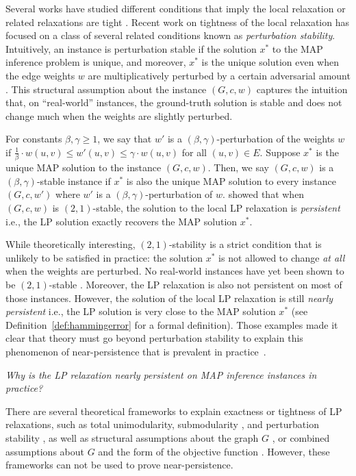 Several works have studied different conditions that imply the local relaxation or related relaxations are tight \citep[e.g.,][]{kolmogorov2005optimality, wainwright2008graphical, thapper2012power, weller2016tightness,rowland2017conditions}.
Recent work on tightness of the local relaxation has focused on a class of several related conditions known as \emph{perturbation stability}.
Intuitively, an instance is perturbation stable if the solution $x^*$ to the MAP inference problem is unique, and moreover, $x^*$ is the unique solution even when the edge weights $w$ are multiplicatively perturbed by a certain adversarial amount \cite{BLstable}.
This structural assumption about the instance $(G,c,w)$ captures the intuition that, on ``real-world'' instances, the ground-truth solution is stable and does not change much when the weights are slightly perturbed.

For constants $\beta, \gamma \geq 1$, we say that $w'$ is a $(\beta,\gamma)$-perturbation of the weights $w$ if $\frac{1}{\beta}\cdot w(u,v) \le w'(u,v) \le \gamma \cdot w(u,v)$ for all $(u,v)\in E$. 
Suppose $x^*$ is the unique MAP solution to the instance $(G,c,w)$. Then, we say $(G,c,w)$ is a $(\beta,\gamma)$-stable instance if $x^*$ is also the unique MAP solution to every instance $(G,c,w')$ where $w'$ is a $(\beta,\gamma)$-perturbation of $w$.
 \citet{LanSonVij18} showed that when $(G,c,w)$ is $(2,1)$-stable, the solution to the local LP relaxation is {\em persistent} i.e., the LP solution exactly recovers the MAP solution $x^*$.

While theoretically interesting, $(2,1)$-stability is a strict condition that is unlikely to be satisfied in practice: the solution $x^*$ is not allowed to change \emph{at all} when the weights are perturbed. No real-world instances have yet been shown to be $(2,1)$-stable \citep{LanSonVij19}. Moreover, the LP relaxation is also not persistent on most of those instances. However, the solution of the local LP relaxation is still {\em nearly persistent} i.e., the LP solution is very close to the MAP solution $x^*$ (see Definition~\ref{def:hammingerror} for a formal definition). 
Those examples made it clear that theory must go beyond perturbation stability to explain this phenomenon of near-persistence that is prevalent in practice~\citep[see e.g.,][]{Sontagthesis, shekhovtsov2017maximum}.

{\em Why is the LP relaxation nearly persistent on MAP inference instances in practice?}

There are several theoretical frameworks to explain exactness or tightness of LP relaxations, such as total unimodularity, submodularity \citep{kolmogorov2005optimality}, and perturbation stability \citep{LanSonVij18, LanSonVij19}, as well as structural assumptions about the graph $G$ \citep{wainwright2008graphical}, or combined assumptions about $G$ and the form of the objective function \citep{weller2016tightness, rowland2017conditions}. However, these frameworks can not be used to prove near-persistence.

